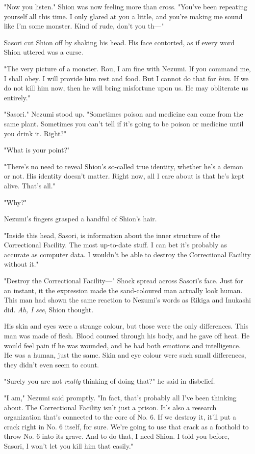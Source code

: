 "Now you listen." Shion was now feeling more than cross. "You've been
repeating yourself all this time. I only glared at you a little, and
you're making me sound like I'm some monster. Kind of rude, don't you
th---"

Sasori cut Shion off by shaking his head. His face contorted, as if
every word Shion uttered was a curse.

"The very picture of a monster. Rou, I am fine with Nezumi. If you
command me, I shall obey. I will provide him rest and food. But I cannot
do that for \emph{him}. If we do not kill him now, then he will bring
misfortune upon us. He may obliterate us entirely."

"Sasori." Nezumi stood up. "Sometimes poison and medicine can come from
the same plant. Sometimes you can't tell if it's going to be poison or
medicine until you drink it. Right?"

"\el What is your point?"

"There's no need to reveal Shion's so-called true identity, whether he's
a demon or not. His identity doesn't matter. Right now, all I care about
is that he's kept alive. That's all."

"Why?"

Nezumi's fingers grasped a handful of Shion's hair.

"Inside this head, Sasori, is information about the inner structure of
the Correctional Facility. The most up-to-date stuff. I can bet it's
probably as accurate as computer data. I wouldn't be able to destroy the
Correctional Facility without it."

"Destroy the Correctional Facility---" Shock spread across Sasori's face.
Just for an instant, it the expression made the sand-coloured man
actually look human. This man had shown the same reaction to Nezumi's
words as Rikiga and Inukashi did. \emph{Ah, I see}, Shion thought.

His skin and eyes were a strange colour, but those were the only
differences. This man was made of flesh. Blood coursed through his body,
and he gave off heat. He would feel pain if he was wounded, and he had
both emotions and intelligence. He was a human, just the same. Skin and
eye colour were such small differences, they didn't even seem to count.

"Surely you are not \emph{really} thinking of doing that?" he said in
disbelief.

"I am," Nezumi said promptly. "In fact, that's probably all I've been
thinking about. The Correctional Facility isn't just a prison. It's also
a research organization that's connected to the core of No. 6. If we
destroy it, it'll put a crack right in No. 6 itself, for sure. We're
going to use that crack as a foothold to throw No. 6 into its grave. And
to do that, I need Shion. I told you before, Sasori, I won't let you
kill him that easily."

